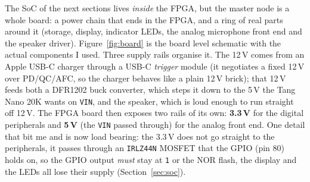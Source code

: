 \documentclass[a4paper,11pt]{article}
\begin{document}
The SoC of the next sections lives \emph{inside} the FPGA, but the master node is
a whole board: a power chain that ends in the FPGA, and a ring of real parts
around it (storage, display, indicator LEDs, the analog microphone front end and
the speaker driver). Figure~\ref{fig:board} is the board level schematic with the
actual components I used. Three supply rails organise it. The 12\,V comes from an
Apple USB-C charger through a USB-C \emph{trigger} module (it negotiates a fixed
12\,V over PD/QC/AFC, so the charger behaves like a plain 12\,V brick); that 12\,V
feeds both a DFR1202 buck converter, which steps it down to the 5\,V the Tang Nano
20K wants on \texttt{VIN}, and the speaker, which is loud enough to run straight
off 12\,V. The FPGA board then exposes two rails of its own: \textbf{3.3\,V} for
the digital peripherals and \textbf{5\,V} (the \texttt{VIN} passed through) for the
analog front end. One detail that bit me and is now load bearing: the 3.3\,V does
not go straight to the peripherals, it passes through an \texttt{IRLZ44N} MOSFET
that the GPIO (pin 80) holds on, so the GPIO output \emph{must} stay at \texttt{1}
or the NOR flash, the display and the LEDs all lose their supply
(Section~\ref{sec:soc}).
\end{document}
